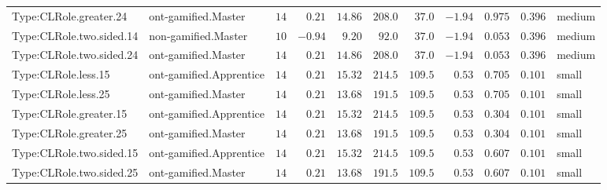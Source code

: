\documentclass[6pt,a4paper]{article}
\begin{document}
{\begin{longtable}{llrrrrrrrrl}
Type:CLRole.greater.24&ont-gamified.Master&$14$&$ 0.21$&$14.86$&$208.0$&$ 37.0$&$-1.94$&$0.975$&$0.396$&medium\tabularnewline
Type:CLRole.two.sided.14&non-gamified.Master&$10$&$-0.94$&$ 9.20$&$ 92.0$&$ 37.0$&$-1.94$&$0.053$&$0.396$&medium\tabularnewline
Type:CLRole.two.sided.24&ont-gamified.Master&$14$&$ 0.21$&$14.86$&$208.0$&$ 37.0$&$-1.94$&$0.053$&$0.396$&medium\tabularnewline
Type:CLRole.less.15&ont-gamified.Apprentice&$14$&$ 0.21$&$15.32$&$214.5$&$109.5$&$ 0.53$&$0.705$&$0.101$&small\tabularnewline
Type:CLRole.less.25&ont-gamified.Master&$14$&$ 0.21$&$13.68$&$191.5$&$109.5$&$ 0.53$&$0.705$&$0.101$&small\tabularnewline
Type:CLRole.greater.15&ont-gamified.Apprentice&$14$&$ 0.21$&$15.32$&$214.5$&$109.5$&$ 0.53$&$0.304$&$0.101$&small\tabularnewline
Type:CLRole.greater.25&ont-gamified.Master&$14$&$ 0.21$&$13.68$&$191.5$&$109.5$&$ 0.53$&$0.304$&$0.101$&small\tabularnewline
\newpage
Type:CLRole.two.sided.15&ont-gamified.Apprentice&$14$&$ 0.21$&$15.32$&$214.5$&$109.5$&$ 0.53$&$0.607$&$0.101$&small\tabularnewline
Type:CLRole.two.sided.25&ont-gamified.Master&$14$&$ 0.21$&$13.68$&$191.5$&$109.5$&$ 0.53$&$0.607$&$0.101$&small\tabularnewline
\hline
\end{longtable}}
\end{document}
